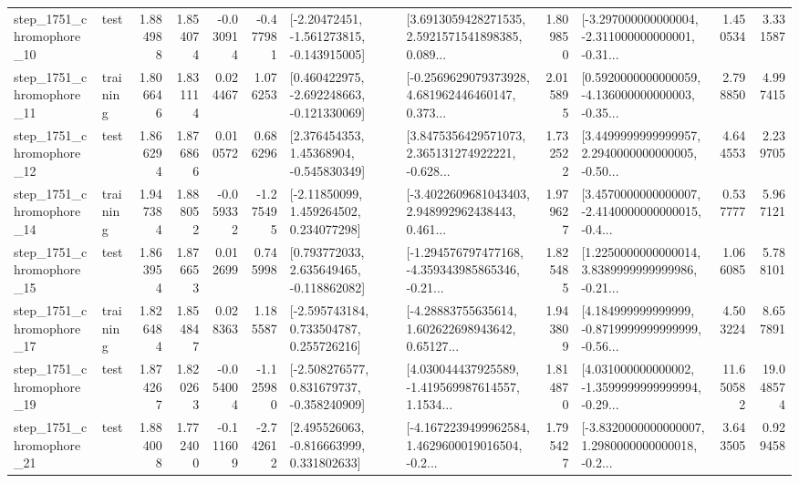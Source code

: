 \begin{tabular}{llrrrrllrlrr}
 step\_1751\_chromophore\_10 &      test &      1.884988 &    1.854074 &     -0.030914 & -0.477981 &   [-2.20472451, -1.561273815, -0.143915005] &  [3.6913059428271535, 2.5921571541898385, 0.089... &       1.809850 &  [-3.297000000000004, -2.311000000000001, -0.31... &            1.450534 &          3.331587 \\
 step\_1751\_chromophore\_11 &  training &      1.806646 &    1.831114 &      0.024467 &  1.076253 &   [0.460422975, -2.692248663, -0.121330069] &  [-0.2569629079373928, 4.681962446460147, 0.373... &       2.015895 &  [0.5920000000000059, -4.136000000000003, -0.35... &            2.798850 &          4.997415 \\
 step\_1751\_chromophore\_12 &      test &      1.866294 &    1.876866 &      0.010572 &  0.686296 &     [2.376454353, 1.45368904, -0.545830349] &  [3.8475356429571073, 2.365131274922221, -0.628... &       1.732522 &  [3.4499999999999957, 2.2940000000000005, -0.50... &            4.644553 &          2.239705 \\
 step\_1751\_chromophore\_14 &  training &      1.947384 &    1.888052 &     -0.059332 & -1.275495 &     [-2.11850099, 1.459264502, 0.234077298] &  [-3.4022609681043403, 2.948992962438443, 0.461... &       1.979627 &  [3.4570000000000007, -2.4140000000000015, -0.4... &            0.537777 &          5.967121 \\
 step\_1751\_chromophore\_15 &      test &      1.863954 &    1.876653 &      0.012699 &  0.745998 &    [0.793772033, 2.635649465, -0.118862082] &  [-1.294576797477168, -4.359343985865346, -0.21... &       1.825485 &  [1.2250000000000014, 3.8389999999999986, -0.21... &            1.066085 &          5.788101 \\
 step\_1751\_chromophore\_17 &  training &      1.826484 &    1.854847 &      0.028363 &  1.185587 &    [-2.595743184, 0.733504787, 0.255726216] &  [-4.28883755635614, 1.602622698943642, 0.65127... &       1.943809 &  [4.184999999999999, -0.8719999999999999, -0.56... &            4.503224 &          8.657891 \\
 step\_1751\_chromophore\_19 &      test &      1.874267 &    1.820263 &     -0.054004 & -1.125980 &   [-2.508276577, 0.831679737, -0.358240909] &  [4.030044437925589, -1.419569987614557, 1.1534... &       1.814870 &  [4.031000000000002, -1.3599999999999994, -0.29... &           11.650582 &         19.048574 \\
 step\_1751\_chromophore\_21 &      test &      1.884008 &    1.772400 &     -0.111609 & -2.742612 &    [2.495526063, -0.816663999, 0.331802633] &  [-4.1672239499962584, 1.4629600019016504, -0.2... &       1.795427 &  [-3.8320000000000007, 1.2980000000000018, -0.2... &            3.643505 &          0.929458 \\

\end{tabular}
